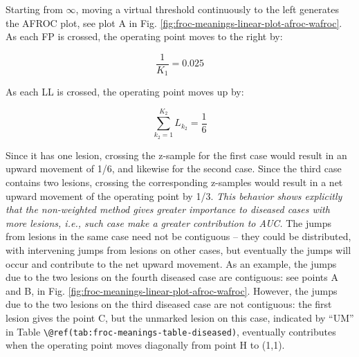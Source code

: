 \documentclass[
]{book}
\begin{document}
Starting from \(\infty\), moving a virtual threshold continuously to the left generates the AFROC plot, see plot A in Fig. \ref{fig:froc-meanings-linear-plot-afroc-wafroc}. As each FP is crossed, the operating point moves to the right by:

\[\frac{1}{K_1} = 0.025\]

As each LL is crossed, the operating point moves up by:

\[\sum_{k_2=1}^{K_2}L_{k_2}=\frac{1}{6}\]

Since it has one lesion, crossing the z-sample for the first case would result in an upward movement of 1/6, and likewise for the second case. Since the third case contains two lesions, crossing the corresponding z-samples would result in a net upward movement of the operating point by 1/3. \emph{This behavior shows explicitly that the non-weighted method gives greater importance to diseased cases with more lesions, i.e., such case make a greater contribution to AUC.} The jumps from lesions in the same case need not be contiguous -- they could be distributed, with intervening jumps from lesions on other cases, but eventually the jumps will occur and contribute to the net upward movement. As an example, the jumps due to the two lesions on the fourth diseased case are contiguous: see points A and B, in Fig. \ref{fig:froc-meanings-linear-plot-afroc-wafroc}. However, the jumps due to the two lesions on the third diseased case are not contiguous: the first lesion gives the point C, but the unmarked lesion on this case, indicated by ``UM'' in Table \texttt{\textbackslash{}@ref(tab:froc-meanings-table-diseased)}, eventually contributes when the operating point moves diagonally from point H to (1,1).
\end{document}
